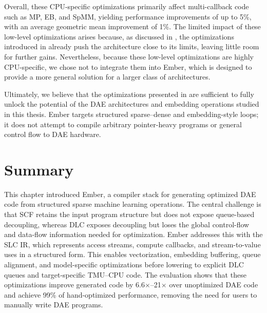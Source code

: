 Overall, these CPU-specific optimizations primarily affect multi-callback code such as MP, EB, and SpMM, yielding performance improvements of up to 5\%, with an average geometric mean improvement of 1\%. The limited impact of these low-level optimizations arises because, as discussed in , the optimizations introduced in  already push the architecture close to its limits, leaving little room for further gains. Nevertheless, because these low-level optimizations are highly CPU-specific, we chose not to integrate them into Ember, which is designed to provide a more general solution for a larger class of architectures.

Ultimately, we believe that the optimizations presented in  are sufficient to fully unlock the potential of the DAE architectures and embedding operations studied in this thesis. Ember targets structured sparse--dense and embedding-style loops; it does not attempt to compile arbitrary pointer-heavy programs or general control flow to DAE hardware.

\section{Summary} \label{sec:ember-summary}

This chapter introduced Ember, a compiler stack for generating optimized DAE code from structured sparse machine learning operations. The central challenge is that SCF retains the input program structure but does not expose queue-based decoupling, whereas DLC exposes decoupling but loses the global control-flow and data-flow information needed for optimization. Ember addresses this with the SLC IR, which represents access streams, compute callbacks, and stream-to-value uses in a structured form. This enables vectorization, embedding buffering, queue alignment, and model-specific optimizations before lowering to explicit DLC queues and target-specific TMU--CPU code. The evaluation shows that these optimizations improve generated code by 6.6$\times$--21$\times$ over unoptimized DAE code and achieve 99\% of hand-optimized performance, removing the need for users to manually write DAE programs.
